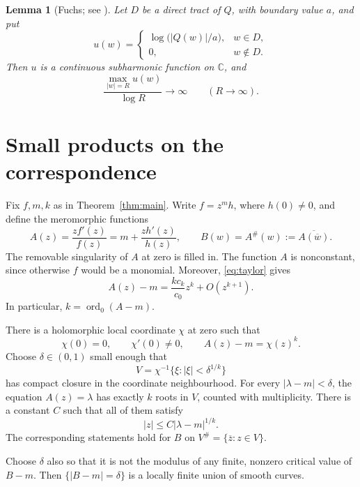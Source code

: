 \documentclass[11pt]{article}
\newtheorem{lemma}[theorem]{Lemma}
\theoremstyle{remark}
\numberwithin{equation}{section}
\DeclareMathOperator{\ord}{ord}
\newcommand{\C}{\mathbb C}
\begin{document}
\begin{lemma}[Fuchs; see {\cite[Theorem 2.1]{BRS}}]
\label{lem:tract}
Let \(D\) be a direct tract of \(Q\), with boundary value \(a\), and put
\[
 u(w)=
 \begin{cases}
  \log\bigl(|Q(w)|/a\bigr),&w\in D,\\
  0,&w\notin D.
 \end{cases}
\]
Then \(u\) is a continuous subharmonic function on \(\C\), and
\begin{equation}\label{eq:tract-growth}
 \frac{\max_{|w|=R}u(w)}{\log R}\longrightarrow\infty
 \qquad(R\to\infty).
\end{equation}
\end{lemma}

\section{Small products on the correspondence}\label{sec:products}

Fix \(f,m,k\) as in Theorem~\ref{thm:main}. Write \(f=z^m h\), where
\(h(0)\ne0\), and define the meromorphic functions
\begin{equation}\label{eq:AB}
 A(z)=\frac{zf'(z)}{f(z)}=m+\frac{zh'(z)}{h(z)},
 \qquad B(w)=A^\#(w):=\overline{A(\overline w)}.
\end{equation}
The removable singularity of \(A\) at zero is filled in.
The function \(A\) is nonconstant, since otherwise \(f\) would be a
monomial. Moreover, \eqref{eq:taylor} gives
\[
 A(z)-m=\frac{kc_k}{c_0}z^k+O(z^{k+1}).
\]
In particular, \(k=\ord_0(A-m)\).

There is a holomorphic local coordinate \(\chi\) at zero such that
\begin{equation}\label{eq:coordinate}
 \chi(0)=0,\qquad\chi'(0)\ne0,
 \qquad A(z)-m=\chi(z)^k.
\end{equation}
Choose \(\delta\in(0,1)\) small enough that
\[
 V=\chi^{-1}\{\xi:|\xi|<\delta^{1/k}\}
\]
has compact closure in the coordinate neighbourhood.
For every \(|\lambda-m|<\delta\), the equation \(A(z)=\lambda\)
has exactly \(k\) roots in \(V\), counted with multiplicity.
There is a constant \(C\) such that all of them satisfy
\begin{equation}\label{eq:root-bound}
 |z|\le C|\lambda-m|^{1/k}.
\end{equation}
The corresponding statements hold for \(B\) on
\(V^\#=\{\overline z:z\in V\}\).

Choose \(\delta\) also so that it is not the modulus of any finite,
nonzero critical value of \(B-m\). Then
\(\{|B-m|=\delta\}\) is a locally finite union of smooth curves.
\end{document}
